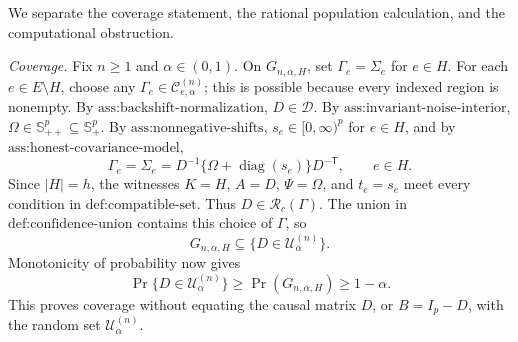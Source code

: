 We separate the coverage statement, the rational population calculation, and the computational obstruction.

\emph{Coverage.}  Fix \(n\ge1\) and \(\alpha\in(0,1)\).  On \(G_{n,\alpha,H}\), set \(\Gamma_e=\Sigma_e\) for \(e\in H\).  For each \(e\in E\setminus H\), choose any \(\Gamma_e\in\mathcal C^{(n)}_{e,\alpha}\); this is possible because every indexed region is nonempty.  By \(\text{ass:backshift-normalization}\), \(D\in\mathcal D\).  By \(\text{ass:invariant-noise-interior}\), \(\Omega\in\mathbb S_{++}^p\subseteq\mathbb S_+^p\).  By \(\text{ass:nonnegative-shifts}\), \(s_e\in[0,\infty)^p\) for \(e\in H\), and by \(\text{ass:honest-covariance-model}\),
\[
\Gamma_e=\Sigma_e=D^{-1}\{\Omega+\operatorname{diag}(s_e)\}D^{-\mathsf T},\qquad e\in H.
\]
Since \(|H|=h\), the witnesses \(K=H\), \(A=D\), \(\Psi=\Omega\), and \(t_e=s_e\) meet every condition in \(\text{def:compatible-set}\).  Thus \(D\in\mathcal R_c(\Gamma)\).  The union in \(\text{def:confidence-union}\) contains this choice of \(\Gamma\), so
\[
G_{n,\alpha,H}\subseteq\{D\in\mathcal U^{(n)}_\alpha\}.
\]
Monotonicity of probability now gives
\[
\Pr\{D\in\mathcal U^{(n)}_\alpha\}\ge \Pr(G_{n,\alpha,H})\ge1-\alpha.
\]
This proves coverage without equating the causal matrix \(D\), or \(B=I_p-D\), with the random set \(\mathcal U^{(n)}_\alpha\).

